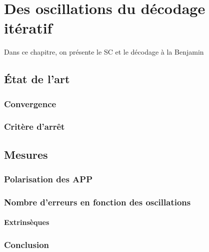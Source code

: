 \chapter{Des oscillations du décodage itératif} %
\label{cha:chapter_3}

Dans ce chapitre, on présente le SC et le décodage  à la Benjamin

\vspace*{\fill}
\minitocTITI
\vspace*{\fill}

\section{État de l'art} %
\label{sec:_tat_de_l_art}

\subsection{Convergence} 
\label{sub:convergence}


\subsection{Critère d'arrêt}
\label{sub:crit_re_d_arr_t}



\section{Mesures} %
\label{sec:mesures}

\subsection{Polarisation des APP}
\label{sub:polarisation_des_app}

\subsection{Nombre d'erreurs en fonction des oscillations}
\label{sub:nombre_d_erreurs_en_fonction_des_oscillations}


\subsubsection{Extrinsèques} 
\label{ssub:extrins_ques}

\subsection{Conclusion} %
\label{sub:conclusion}

